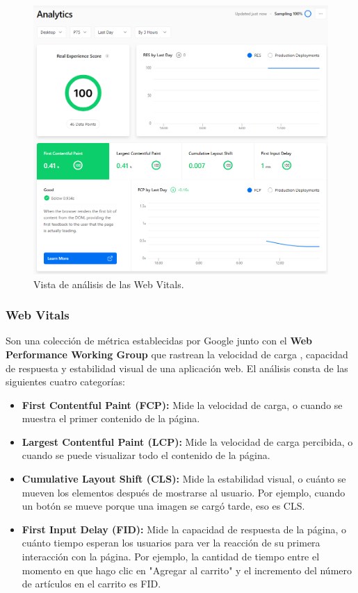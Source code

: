 \documentclass[12pt,twoside,titlepage]{report}
\begin{document}
{\begin{figure}[H]
    \centering
    \includegraphics[scale=0.5]{Vercel/RealExperienceScore}
    \caption{Vista de análisis de las Web Vitals.}
    \label{fig:Vercel_metrics}
\end{figure}

\subsubsection{Web Vitals}

Son una colección de métrica establecidas por Google \cite{webdev} junto con el \textbf{Web Performance Working Group} \cite{w3} que rastrean la velocidad de carga , capacidad de respuesta y estabilidad visual de una aplicación web. El análisis consta de las siguientes cuatro categorías:

\begin{itemize}
    \item\textbf{First Contentful Paint (FCP):} Mide la velocidad de carga, o cuando se muestra el primer contenido de la página.
    \item\textbf{Largest Contentful Paint (LCP):} Mide la velocidad de carga percibida, o cuando se puede visualizar todo el contenido de la página.
    \item\textbf{Cumulative Layout Shift (CLS):} Mide la estabilidad visual, o cuánto se mueven los elementos después de mostrarse al usuario. Por ejemplo, cuando un botón se mueve porque una imagen se cargó tarde, eso es CLS.
    \item\textbf{First Input Delay (FID):} Mide la capacidad de respuesta de la página, o cuánto tiempo esperan los usuarios para ver la reacción de su primera interacción con la página. Por ejemplo, la cantidad de tiempo entre el momento en que hago clic en "Agregar al carrito" y el incremento del número de artículos en el carrito es FID.
\end{itemize}

}
\end{document}
